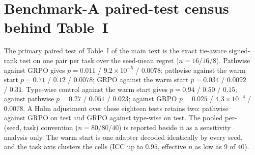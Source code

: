 \section{Benchmark-A paired-test census behind Table~I}
\label{supp:acensus}
The primary paired test of Table~I of the main text is the exact tie-aware
signed-rank test on one pair per task over the seed-mean regret ($n=16$/$16$/$8$).
Pathwise against GRPO gives $p=0.011$ / $9.2\times10^{-5}$ / $0.0078$; pathwise
against the warm start $p=0.71$ / $0.12$ / $0.0078$; GRPO against the warm start
$p=0.034$ / $0.0092$ / $0.31$.  Type-wise control against the warm start gives
$p=0.94$ / $0.50$ / $0.15$; against pathwise $p=0.27$ / $0.051$ / $0.023$; against
GRPO $p=0.025$ / $4.3\times10^{-4}$ / $0.0078$.  A Holm adjustment over these
eighteen tests retains two: pathwise against GRPO on test and GRPO against
type-wise on test.  The pooled per-(seed, task) convention ($n=80$/$80$/$40$) is
reported beside it as a sensitivity analysis only.  The warm start is one adapter
decoded identically by every seed, and the task axis clusters the cells (ICC up to
$0.95$, effective $n$ as low as $9$ of $40$).
